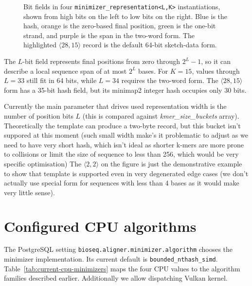 \begin{figure}[H]
\caption{Bit fields in four \texttt{minimizer\_representation<L,K>}
instantiations, shown from high bits on the left to low bits on the right.
Blue is the hash, orange is the zero-based final position, green is the
one-bit strand, and purple is the span in the two-word form.  The highlighted
$\langle28,15\rangle$ record is the default 64-bit sketch-data form.}
\label{fig:minimizer-representation-layout}
\end{figure}

The $L$-bit field represents final positions from zero through
$2^L-1$, so it can describe a local sequence span of at most $2^L$ bases.
For $K=15$, values through $L=33$ still fit in 64 bits, while $L=34$
requires the two-word form.  The $\langle28,15\rangle$ form has a 35-bit hash
field, but its minimap2 integer hash occupies only 30 bits.

Currently the main parameter that drives used representation width is the number of position bits $L$ (this is compared against \emph{kmer\_size\_buckets} array).
Theoretically the template can produce a two-byte record, but this bucket isn't suppored at this moment (such small width make's it problematic to adjust as we need to have very short hash, which isn't ideal as shorter k-mers are more prone to collisions or limit the size of sequence to less than 256, which would be very specific optimisation)
The $\langle2,2\rangle$ on the figure is just the demonstrative example to show that template is supported even in very degenerated edge cases (we don't actually use special form for sequences with less than 4 bases as it would make very little sense).


\section{Configured CPU algorithms}
\label{sec:configured-cpu-minimizers}

The PostgreSQL setting \texttt{bioseq.aligner.minimizer.algorithm} chooses the
minimizer implementation. Its current default is \texttt{bounded\_nthash\_simd}. Table~\ref{tab:current-cpu-minimizers}
maps the four CPU values to the algorithm families described earlier. Additionally we allow dispatching Vulkan kernel.

